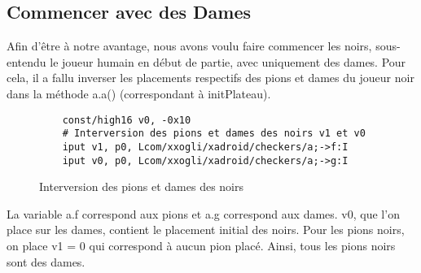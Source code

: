 
\subsection{Commencer avec des Dames}

Afin d'être à notre avantage, nous avons voulu faire commencer les noirs,
sous-entendu le joueur humain en début de partie, avec uniquement des dames.
Pour cela, il a fallu inverser les placements respectifs des pions et dames du joueur noir dans la méthode a.a() (correspondant à initPlateau).

\begin{figure}[!h]
\begin{verbatim}
    const/high16 v0, -0x10
	# Interversion des pions et dames des noirs v1 et v0
    iput v1, p0, Lcom/xxogli/xadroid/checkers/a;->f:I
    iput v0, p0, Lcom/xxogli/xadroid/checkers/a;->g:I
\end{verbatim}
    \caption{Interversion des pions et dames des noirs}
\end{figure}

La variable a.f correspond aux pions et a.g correspond aux dames.
v0, que l'on place sur les dames, contient le placement initial des noirs.
Pour les pions noirs, on place v1 = 0 qui correspond à aucun pion placé.
Ainsi, tous les pions noirs sont des dames.
